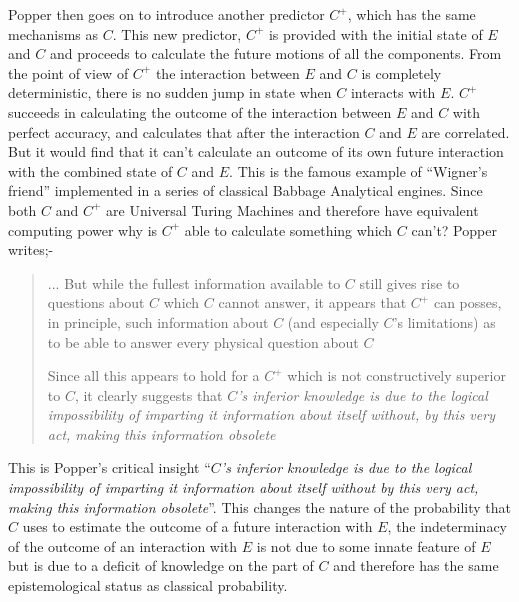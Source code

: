 Popper then goes on to introduce another predictor $C^+$, which has the same mechanisms as $C$.
This new predictor, $C^+$ is provided with the initial state of $E$ and $C$ and proceeds to
calculate the future motions of all the components. From the point of view of $C^+$ the
interaction between $E$ and $C$ is completely deterministic, there is no sudden jump in state
when $C$ interacts with $E$. $C^+$ succeeds in calculating the outcome of the interaction
between $E$ and $C$ with perfect accuracy, and calculates that after the interaction $C$ and $E$
are correlated. But it would find that it can't calculate an outcome of its own future
interaction with the combined state of $C$ and $E$. This is the famous example of
\enquote{Wigner's friend} \autocite{wigner_1961} implemented in a series of classical
Babbage Analytical engines. Since both $C$ and $C^+$ are Universal Turing Machines and therefore
have equivalent computing power why is $C^+$ able to calculate something which $C$ can't? Popper
writes;-
\begin{quotation}
... But while the fullest information available to $C$ still gives rise to questions about $C$
which $C$ cannot answer, it appears that $C^+$ can posses, in principle, such information about
$C$ (and especially $C$'s limitations) as to be able to answer every physical question about $C$
  \par
Since all this appears to hold for a $C^+$ which is not constructively superior to $C$, it
clearly suggests that
\emph{$C$'s inferior knowledge is due to the logical impossibility of imparting it information about itself without, by this very act, making this information obsolete}
  \par
\hfill \autocite[p.~188]{Popper1950a}
\end{quotation}
This is Popper's critical insight
\enquote{{\emph{$C$'s inferior knowledge is due to the logical impossibility of imparting it information about itself without by this very act, making this information obsolete}}}.
This changes the nature of the probability that $C$ uses to estimate the outcome of a future
interaction with $E$, the indeterminacy of the outcome of an interaction with $E$ is not due to
some innate feature of $E$ but is due to a deficit of knowledge on the part of $C$ and therefore
has the same epistemological status as classical probability.

